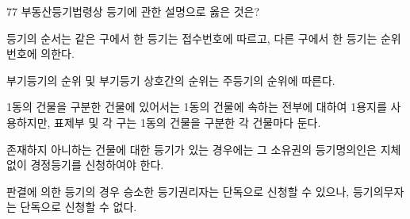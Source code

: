 \begin{question}{77}
부동산등기법령상 등기에 관한 설명으로 옳은 것은?
\begin{choices}
  \item 등기의 순서는 같은 구에서 한 등기는 접수번호에 따르고, 다른 구에서 한 등기는 순위번호에 의한다.
  \item 부기등기의 순위 및 부기등기 상호간의 순위는 주등기의 순위에 따른다.
  \item 1동의 건물을 구분한 건물에 있어서는 1동의 건물에 속하는 전부에 대하여 1용지를 사용하지만, 표제부 및 각 구는 1동의 건물을 구분한 각 건물마다 둔다.
  \item 존재하지 아니하는 건물에 대한 등기가 있는 경우에는 그 소유권의 등기명의인은 지체 없이 경정등기를 신청하여야 한다.
  \item 판결에 의한 등기의 경우 승소한 등기권리자는 단독으로 신청할 수 있으나, 등기의무자는 단독으로 신청할 수 없다.
\end{choices}
\end{question}
